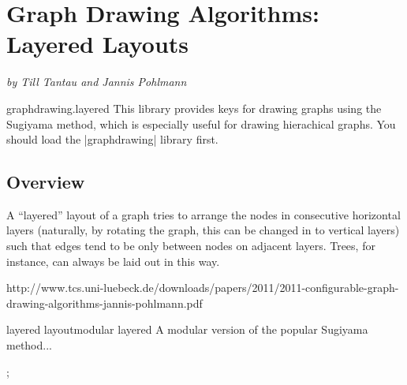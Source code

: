 %
%
%

\section{Graph Drawing Algorithms: Layered Layouts}

{\emph{by  Till Tantau and Jannis Pohlmann}}

\begin{tikzlibrary}{graphdrawing.layered}
  This library provides keys for drawing graphs using the Sugiyama
  method, which is especially useful for drawing hierachical graphs.
  You should load the |graphdrawing| library first.
\end{tikzlibrary}



\subsection{Overview}

A ``layered'' layout of a graph tries to arrange the nodes in
consecutive horizontal layers (naturally, by rotating the graph, this
can be changed in to vertical layers) such that edges tend to be only
between nodes on adjacent layers. Trees, for instance, can always be
laid out in this way.




http://www.tcs.uni-luebeck.de/downloads/papers/2011/2011-configurable-graph-drawing-algorithms-jannis-pohlmann.pdf



\begin{gdalgorithm}{layered layout}{modular layered}
  A modular version of the popular Sugiyama method...
\begin{codeexample}[]
 ;    
\end{codeexample}
\end{gdalgorithm}



